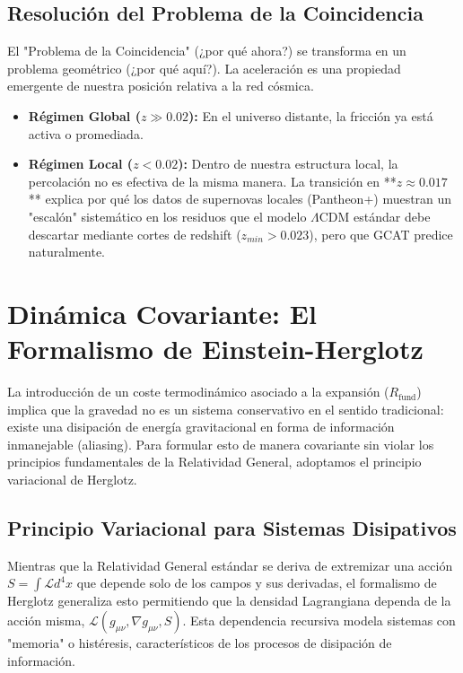\documentclass[12pt, a4paper]{article}
\theoremstyle{plain}
\theoremstyle{definition}
\begin{document}
\subsection{Resolución del Problema de la Coincidencia}

El "Problema de la Coincidencia" (¿por qué ahora?) se transforma en un problema geométrico (¿por qué aquí?). La aceleración es una propiedad emergente de nuestra posición relativa a la red cósmica.

\begin{itemize}
    \item \textbf{Régimen Global ($z \gg 0.02$):} En el universo distante, la fricción ya está activa o promediada.
    \item \textbf{Régimen Local ($z < 0.02$):} Dentro de nuestra estructura local, la percolación no es efectiva de la misma manera. La transición en **$z \approx 0.017$** explica por qué los datos de supernovas locales (Pantheon+) muestran un "escalón" sistemático en los residuos que el modelo $\Lambda$CDM estándar debe descartar mediante cortes de redshift ($z_{min} > 0.023$), pero que GCAT predice naturalmente.
\end{itemize}

\section{Dinámica Covariante: El Formalismo de Einstein-Herglotz}
\label{sec:dinamica}

La introducción de un coste termodinámico asociado a la expansión ($R_{\text{fund}}$) implica que la gravedad no es un sistema conservativo en el sentido tradicional: existe una disipación de energía gravitacional en forma de información inmanejable (aliasing). Para formular esto de manera covariante sin violar los principios fundamentales de la Relatividad General, adoptamos el principio variacional de Herglotz.

\subsection{Principio Variacional para Sistemas Disipativos}

Mientras que la Relatividad General estándar se deriva de extremizar una acción $S = \int \mathcal{L} d^4x$ que depende solo de los campos y sus derivadas, el formalismo de Herglotz generaliza esto permitiendo que la densidad Lagrangiana dependa de la acción misma, $\mathcal{L}(g_{\mu\nu}, \nabla g_{\mu\nu}, S)$. Esta dependencia recursiva modela sistemas con "memoria" o histéresis, característicos de los procesos de disipación de información.
\end{document}
